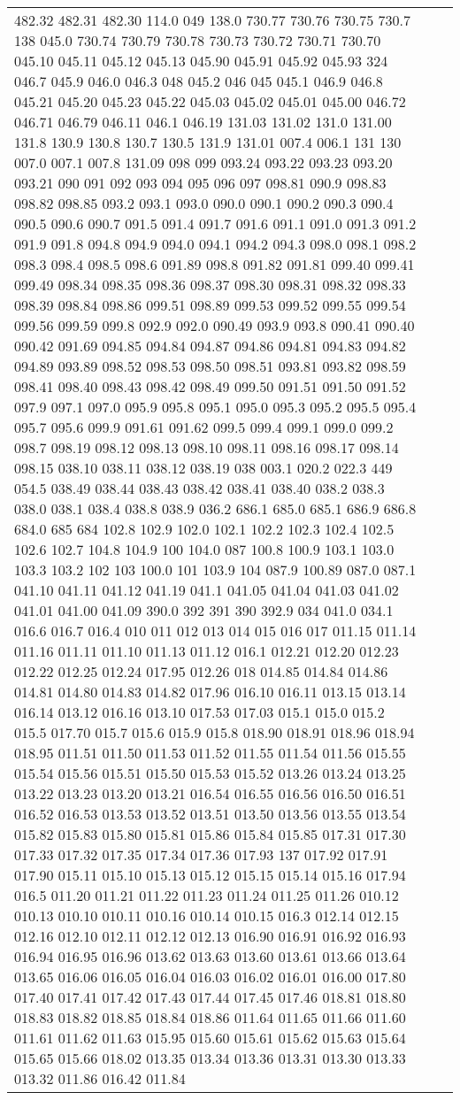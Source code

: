 \begin{longtable}{|L{.1in}|L{.6in}||L{5.65in}|}
482.32 482.31 482.30 114.0 049 138.0 730.77 730.76 730.75 730.7 138 045.0 730.74 730.79 730.78 730.73 730.72 730.71 730.70 045.10 045.11 045.12 045.13 045.90 045.91 045.92 045.93 324 046.7 045.9 046.0 046.3 048 045.2 046 045 045.1 046.9 046.8 045.21 045.20 045.23 045.22 045.03 045.02 045.01 045.00 046.72 046.71 046.79 046.11 046.1 046.19 131.03 131.02 131.0 131.00 131.8 130.9 130.8 130.7 130.5 131.9 131.01 007.4 006.1 131 130 007.0 007.1 007.8 131.09 098 099 093.24 093.22 093.23 093.20 093.21 090 091 092 093 094 095 096 097 098.81 090.9 098.83 098.82 098.85 093.2 093.1 093.0 090.0 090.1 090.2 090.3 090.4 090.5 090.6 090.7 091.5 091.4 091.7 091.6 091.1 091.0 091.3 091.2 091.9 091.8 094.8 094.9 094.0 094.1 094.2 094.3 098.0 098.1 098.2 098.3 098.4 098.5 098.6 091.89 098.8 091.82 091.81 099.40 099.41 099.49 098.34 098.35 098.36 098.37 098.30 098.31 098.32 098.33 098.39 098.84 098.86 099.51 098.89 099.53 099.52 099.55 099.54 099.56 099.59 099.8 092.9 092.0 090.49 093.9 093.8 090.41 090.40 090.42 091.69 094.85 094.84 094.87 094.86 094.81 094.83 094.82 094.89 093.89 098.52 098.53 098.50 098.51 093.81 093.82 098.59 098.41 098.40 098.43 098.42 098.49 099.50 091.51 091.50 091.52 097.9 097.1 097.0 095.9 095.8 095.1 095.0 095.3 095.2 095.5 095.4 095.7 095.6 099.9 091.61 091.62 099.5 099.4 099.1 099.0 099.2 098.7 098.19 098.12 098.13 098.10 098.11 098.16 098.17 098.14 098.15 038.10 038.11 038.12 038.19 038 003.1 020.2 022.3 449 054.5 038.49 038.44 038.43 038.42 038.41 038.40 038.2 038.3 038.0 038.1 038.4 038.8 038.9 036.2 686.1 685.0 685.1 686.9 686.8 684.0 685 684 102.8 102.9 102.0 102.1 102.2 102.3 102.4 102.5 102.6 102.7 104.8 104.9 100 104.0 087 100.8 100.9 103.1 103.0 103.3 103.2 102 103 100.0 101 103.9 104 087.9 100.89 087.0 087.1 041.10 041.11 041.12 041.19 041.1 041.05 041.04 041.03 041.02 041.01 041.00 041.09 390.0 392 391 390 392.9 034 041.0 034.1 016.6 016.7 016.4 010 011 012 013 014 015 016 017 011.15 011.14 011.16 011.11 011.10 011.13 011.12 016.1 012.21 012.20 012.23 012.22 012.25 012.24 017.95 012.26 018 014.85 014.84 014.86 014.81 014.80 014.83 014.82 017.96 016.10 016.11 013.15 013.14 016.14 013.12 016.16 013.10 017.53 017.03 015.1 015.0 015.2 015.5 017.70 015.7 015.6 015.9 015.8 018.90 018.91 018.96 018.94 018.95 011.51 011.50 011.53 011.52 011.55 011.54 011.56 015.55 015.54 015.56 015.51 015.50 015.53 015.52 013.26 013.24 013.25 013.22 013.23 013.20 013.21 016.54 016.55 016.56 016.50 016.51 016.52 016.53 013.53 013.52 013.51 013.50 013.56 013.55 013.54 015.82 015.83 015.80 015.81 015.86 015.84 015.85 017.31 017.30 017.33 017.32 017.35 017.34 017.36 017.93 137 017.92 017.91 017.90 015.11 015.10 015.13 015.12 015.15 015.14 015.16 017.94 016.5 011.20 011.21 011.22 011.23 011.24 011.25 011.26 010.12 010.13 010.10 010.11 010.16 010.14 010.15 016.3 012.14 012.15 012.16 012.10 012.11 012.12 012.13 016.90 016.91 016.92 016.93 016.94 016.95 016.96 013.62 013.63 013.60 013.61 013.66 013.64 013.65 016.06 016.05 016.04 016.03 016.02 016.01 016.00 017.80 017.40 017.41 017.42 017.43 017.44 017.45 017.46 018.81 018.80 018.83 018.82 018.85 018.84 018.86 011.64 011.65 011.66 011.60 011.61 011.62 011.63 015.95 015.60 015.61 015.62 015.63 015.64 015.65 015.66 018.02 013.35 013.34 013.36 013.31 013.30 013.33 013.32 011.86 016.42 011.84 
\end{longtable}
